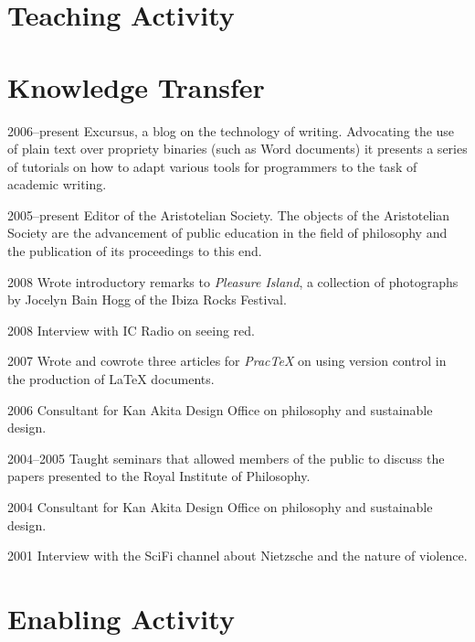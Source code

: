 \documentclass[contbibnum]{cv}
\begin{document}


\section{Teaching Activity}\label{sec:teaching_activity} %




\section{Knowledge Transfer}\label{sec:knowledge_transfer} %

\begin{topic}
	\item[2006--present] Excursus, a blog on the technology of writing. Advocating the use of plain text over propriety binaries (such as Word documents) it presents a series of tutorials on how to adapt various tools for programmers to the task of academic writing.
	\item[2005--present] Editor of the Aristotelian Society. The objects of the Aristotelian Society are the advancement of public education in the field of philosophy and the publication of its proceedings to this end.
	\item[2008] Wrote introductory remarks to \emph{Pleasure Island}, a collection of photographs by Jocelyn Bain Hogg of the Ibiza Rocks Festival.
	\item[2008] Interview with IC Radio on seeing red.
	\item[2007] Wrote and cowrote three articles for \emph{PracTeX} on using version control in the production of LaTeX documents.
	\item[2006] Consultant for Kan Akita Design Office on philosophy and sustainable design.
	\item[2004--2005] Taught seminars that allowed members of the public to discuss the papers presented to the Royal Institute of Philosophy.
	\item[2004] Consultant for Kan Akita Design Office on philosophy and sustainable design.
	\item[2001] Interview with the SciFi channel about Nietzsche and the nature of violence.
\end{topic}


\section{Enabling Activity}\label{sec:enabling_activity} %
\end{document}
